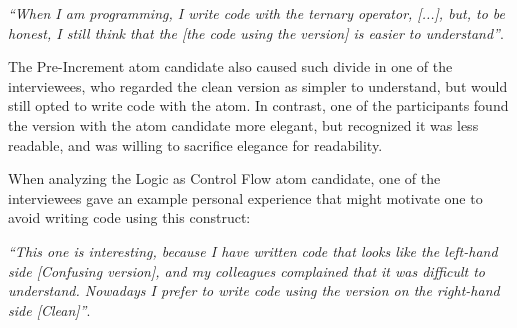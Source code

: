 \begin{mq}
\emph{``When I am programming, I write code with the ternary operator, [...], but, to be honest, I still think that the 
[the code using the \rhs version] 
is easier to understand''}.
\end{mq}



The Pre-Increment atom candidate also caused such
divide in one of the interviewees, who
regarded the clean version as simpler to understand, but would still opted to write
code with the atom. In contrast, %
one of the participants found the version with the atom candidate more elegant, but recognized it was less readable, and was willing to sacrifice elegance for readability.


When analyzing the Logic as Control Flow atom candidate, one of the interviewees gave an example personal experience that might motivate one to avoid writing code using this construct:

\begin{mq}
  \emph{``This one is interesting, because I have written code that looks like the left-hand side [Confusing version], and my colleagues complained that it was difficult to understand. Nowadays I prefer to write code using the version on the right-hand side [Clean]''}.
\end{mq}

